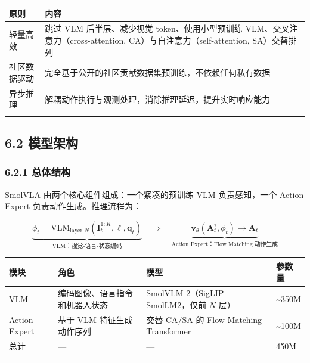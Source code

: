 \documentclass[
  chinese,
]{ctexart}
\begin{document}
\begin{center}
\begin{tabular}{@{}>{\raggedright\arraybackslash}p{} >{\raggedright\arraybackslash}p{}@{}}
\toprule\noalign{}
原则 & 内容 \\
\midrule\noalign{}
轻量高效 & 跳过 VLM 后半层、减少视觉 token、使用小型预训练 VLM、交叉注意力（cross-attention, CA）与自注意力（self-attention, SA）交替排列 \\
社区数据驱动 & 完全基于公开的社区贡献数据集预训练，不依赖任何私有数据 \\
异步推理 & 解耦动作执行与观测处理，消除推理延迟，提升实时响应能力 \\
\bottomrule\noalign{}
\end{tabular}
\end{center}

\subsection{6.2 模型架构}\label{ux6a21ux578bux67b6ux6784-3}

\subsubsection{6.2.1 总体结构}\label{ux603bux4f53ux7ed3ux6784-1}

SmolVLA 由两个核心组件组成：一个紧凑的预训练 VLM 负责感知，一个 Action
Expert 负责动作生成。推理流程为：

\[
\underbrace{\phi_t = \text{VLM}_{\text{layer } N}(\mathbf{I}_t^{1:K}, \ell, \mathbf{q}_t)}_{\text{VLM：视觉-语言-状态编码}} \quad \Longrightarrow \quad \underbrace{\mathbf{v}_\theta(\mathbf{A}_t^\tau, \phi_t) \to \mathbf{A}_t}_{\text{Action Expert：Flow Matching 动作生成}}
\]

\begin{center}
\begin{tabular}{@{}>{\raggedright\arraybackslash}p{} >{\raggedright\arraybackslash}p{} >{\raggedright\arraybackslash}p{} >{\raggedright\arraybackslash}p{}@{}}
\toprule\noalign{}
模块 & 角色 & 模型 & 参数量 \\
\midrule\noalign{}
VLM & 编码图像、语言指令和机器人状态 & SmolVLM-2（SigLIP + SmolLM2，仅前 \(N\) 层） & \textasciitilde350M \\
Action Expert & 基于 VLM 特征生成动作序列 & 交替 CA/SA 的 Flow Matching Transformer & \textasciitilde100M \\
总计 & --- & --- & 450M \\
\bottomrule\noalign{}
\end{tabular}
\end{center}
\end{document}
